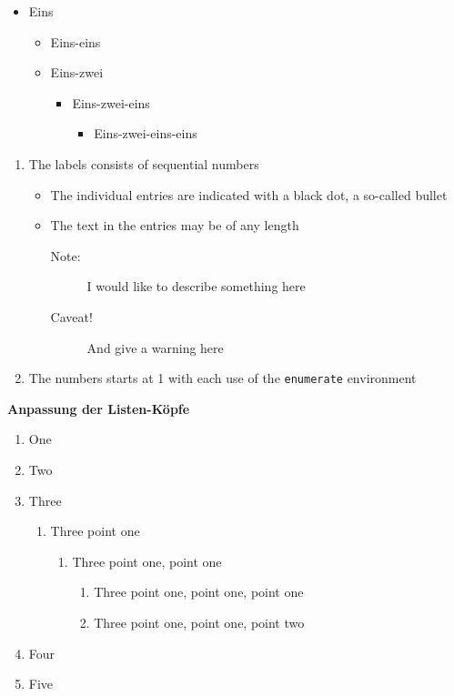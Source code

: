 \documentclass[a5paper]{article}
\begin{document}
\begin{itemize}
  \item Eins
  \begin{itemize}
  \item Eins-eins
  \item Eins-zwei
  \begin{itemize}
    \item Eins-zwei-eins
    \begin{itemize}
      \item Eins-zwei-eins-eins
    \end{itemize}
  \end{itemize}
  \end{itemize}
\end{itemize}



\begin{enumerate}
   \item The labels consists of sequential numbers
   \begin{itemize}
     \item The individual entries are indicated with a black dot, a so-called bullet
     \item The text in the entries may be of any length
     \begin{description}
     \item[Note:] I would like to describe something here
     \item[Caveat!] And give a warning here
     \end{description}
   \end{itemize}
   \item The numbers starts at 1 with each use of the \texttt{enumerate} environment
\end{enumerate}



\textbf{Anpassung der Listen-Köpfe}

\renewcommand{\labelenumii}{\arabic{enumi}.\arabic{enumii}}
\renewcommand{\labelenumiii}{\arabic{enumi}.\arabic{enumii}.\arabic{enumiii}}
\renewcommand{\labelenumiv}{\arabic{enumi}.\arabic{enumii}.\arabic{enumiii}.\arabic{enumiv}}

\begin{enumerate}
\item One
\item Two
\item Three
\begin{enumerate}
    \item Three point one
    \begin{enumerate}
    \item Three point one, point one
        \begin{enumerate}
        \item Three point one, point one, point one
        \item Three point one, point one, point two
        \end{enumerate}
    \end{enumerate}
\end{enumerate}
\item Four
\item Five
\end{enumerate}
\end{document}
